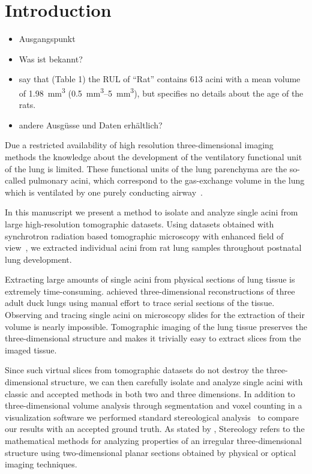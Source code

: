 \documentclass[%
	twoside,
	paper=a4,%
	abstract=true,%
	]{scrartcl}
\begin{document}
\clearpage
\section{Introduction}
\begin{itemize}
	\item Ausgangspunkt
	\item Was ist bekannt?
	\item \citet{Rodriguez1987} say that (Table 1) the RUL of “Rat” contains 613 acini with a mean volume of \SI{1.98}{\milli\meter\cubed} (\SIrange{0.5}{5}{\milli\meter\cubed}), but specifies no details about the age of the rats.
	\item andere Ausgüsse und Daten erhältlich?
\end{itemize}

Due a restricted availability of high resolution three-dimensional imaging methods the knowledge about the development of the ventilatory functional unit of the lung is limited. These functional units of the lung parenchyma are the so-called pulmonary acini, which correspond to the gas-exchange volume in the lung which is ventilated by one purely conducting airway~\cite{Rodriguez1987}.

In this manuscript we present a method to isolate and analyze single acini from large high-resolution tomographic datasets. Using datasets obtained with synchrotron radiation based tomographic microscopy with enhanced field of view~\cite{Haberthuer2010a}, we extracted individual acini from rat lung samples throughout postnatal lung development. 

Extracting large amounts of single acini from physical sections of lung tissue is extremely time-consuming. \citet{Woodward2005} achieved three-dimensional reconstructions of three adult duck lungs using manual effort to trace serial sections of the tissue. Observing and tracing single acini on microscopy slides for the extraction of their volume is nearly impossible. Tomographic imaging of the lung tissue preserves the three-dimensional structure and makes it trivially easy to extract slices from the imaged tissue.

Since such virtual slices from tomographic datasets do not destroy the three-dimensional structure, we can then carefully isolate and analyze single acini with classic and accepted methods in both two and three dimensions. In addition to three-dimensional volume analysis through segmentation and voxel counting in a visualization software we performed standard stereological analysis~\cite{Hsia2010} to compare our results with an accepted ground truth. As stated by \citet{Hsia2010}, Stereology refers to the mathematical methods for analyzing properties of an irregular three-dimensional structure using two-dimensional planar sections obtained by physical or optical imaging techniques.
\end{document}
